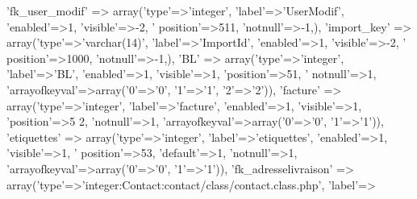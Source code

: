 \begin{DoxyCode}
        \textcolor{stringliteral}{'fk\_user\_modif'} => array(\textcolor{stringliteral}{'type'}=>\textcolor{stringliteral}{'integer'}, \textcolor{stringliteral}{'label'}=>\textcolor{stringliteral}{'UserModif'}, \textcolor{stringliteral}{'enabled'}=>1, \textcolor{stringliteral}{'visible'}=>-2, \textcolor{stringliteral}{'
      position'}=>511, \textcolor{stringliteral}{'notnull'}=>-1,),
        \textcolor{stringliteral}{'import\_key'} => array(\textcolor{stringliteral}{'type'}=>\textcolor{stringliteral}{'varchar(14)'}, \textcolor{stringliteral}{'label'}=>\textcolor{stringliteral}{'ImportId'}, \textcolor{stringliteral}{'enabled'}=>1, \textcolor{stringliteral}{'visible'}=>-2, \textcolor{stringliteral}{'
      position'}=>1000, \textcolor{stringliteral}{'notnull'}=>-1,),
        \textcolor{stringliteral}{'BL'} => array(\textcolor{stringliteral}{'type'}=>\textcolor{stringliteral}{'integer'}, \textcolor{stringliteral}{'label'}=>\textcolor{stringliteral}{'BL'}, \textcolor{stringliteral}{'enabled'}=>1, \textcolor{stringliteral}{'visible'}=>1, \textcolor{stringliteral}{'position'}=>51, \textcolor{stringliteral}{'
      notnull'}=>1, \textcolor{stringliteral}{'arrayofkeyval'}=>array(\textcolor{charliteral}{'0'}=>\textcolor{charliteral}{'0'}, \textcolor{charliteral}{'1'}=>\textcolor{charliteral}{'1'}, \textcolor{charliteral}{'2'}=>\textcolor{charliteral}{'2'})),
        \textcolor{stringliteral}{'facture'} => array(\textcolor{stringliteral}{'type'}=>\textcolor{stringliteral}{'integer'}, \textcolor{stringliteral}{'label'}=>\textcolor{stringliteral}{'facture'}, \textcolor{stringliteral}{'enabled'}=>1, \textcolor{stringliteral}{'visible'}=>1, \textcolor{stringliteral}{'position'}=>5
      2, \textcolor{stringliteral}{'notnull'}=>1, \textcolor{stringliteral}{'arrayofkeyval'}=>array(\textcolor{charliteral}{'0'}=>\textcolor{charliteral}{'0'}, \textcolor{charliteral}{'1'}=>\textcolor{charliteral}{'1'})),
        \textcolor{stringliteral}{'etiquettes'} => array(\textcolor{stringliteral}{'type'}=>\textcolor{stringliteral}{'integer'}, \textcolor{stringliteral}{'label'}=>\textcolor{stringliteral}{'etiquettes'}, \textcolor{stringliteral}{'enabled'}=>1, \textcolor{stringliteral}{'visible'}=>1, \textcolor{stringliteral}{'
      position'}=>53, \textcolor{stringliteral}{'default'}=>1, \textcolor{stringliteral}{'notnull'}=>1, \textcolor{stringliteral}{'arrayofkeyval'}=>array(\textcolor{charliteral}{'0'}=>\textcolor{charliteral}{'0'}, \textcolor{charliteral}{'1'}=>\textcolor{charliteral}{'1'})),
        \textcolor{stringliteral}{'fk\_adresselivraison'} => array(\textcolor{stringliteral}{'type'}=>\textcolor{stringliteral}{'integer:Contact:contact/class/contact.class.php'}, \textcolor{stringliteral}{'label'}=>\textcolor{stringliteral}{
}
\end{DoxyCode}
